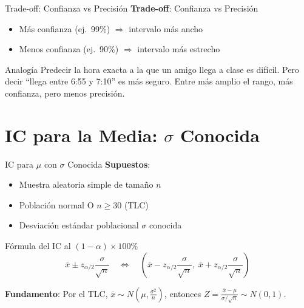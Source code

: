 \documentclass[aspectratio=169, 11pt]{beamer}
\begin{document}
\begin{frame}{Trade-off: Confianza vs Precisi\'on}
\textbf{Trade-off}: Confianza vs Precisi\'on
\begin{itemize}
  \item M\'as confianza (ej.\ 99\%) $\Rightarrow$ intervalo m\'as ancho
  \item Menos confianza (ej.\ 90\%) $\Rightarrow$ intervalo m\'as estrecho
\end{itemize}

\begin{exampleblock}{Analog\'ia}
Predecir la hora exacta a la que un amigo llega a clase es dif\'icil. Pero decir ``llega entre 6:55 y 7:10'' es m\'as seguro. Entre m\'as amplio el rango, m\'as confianza, pero menos precisi\'on.
\end{exampleblock}
\end{frame}

\section{IC para la Media: $\sigma$ Conocida}

\begin{frame}{IC para $\mu$ con $\sigma$ Conocida}
\textbf{Supuestos}:
\begin{itemize}
  \item Muestra aleatoria simple de tamaño $n$
  \item Población normal O $n \geq 30$ (TLC)
  \item Desviación estándar poblacional $\sigma$ \alert{conocida}
\end{itemize}

\vspace{0.2cm}
\begin{block}{Fórmula del IC al $(1-\alpha) \times 100\%$}
\[
\bar{x} \pm z_{\alpha/2} \frac{\sigma}{\sqrt{n}}
\quad\Longleftrightarrow\quad
\left( \bar{x} - z_{\alpha/2} \frac{\sigma}{\sqrt{n}}, \; \bar{x} + z_{\alpha/2} \frac{\sigma}{\sqrt{n}} \right)
\]
\end{block}

\vspace{0.2cm}
\textbf{Fundamento}: Por el TLC, $\bar{x} \sim N\!\left(\mu, \frac{\sigma^2}{n}\right)$, entonces
$Z = \frac{\bar{x} - \mu}{\sigma/\sqrt{n}} \sim N(0,1)$.
\end{frame}
\end{document}

